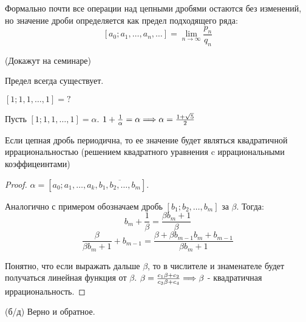 Формально почти все операции над цепными дробями остаются без изменений, но значение дроби определяется как предел подходящего ряда:
$$[a_0;a_1, \dots, a_n,\dots] = \lim_{n \to \infty}\frac{p_n}{q_n}$$
\begin{theorem}{(Докажут на семинаре)}

  Предел всегда существует.
\end{theorem}

\begin{example} $[1; 1, 1, \dots, 1] = ?$

  Пусть $[1; 1, 1, \dots, 1] = \alpha$. $1 + \frac{1}{\alpha} = \alpha \Longrightarrow \alpha = \frac{1 + \sqrt{5}}{2}$
\end{example}

\begin{theorem}
  Если цепная дробь периодична, то ее значение будет являться квадратичной иррациональностью (решением квадратного уравнения c иррациональными коэффицеинтами)
\end{theorem}

\begin{proof}
  $\alpha = [a_0;a_1, \dots, a_k, \overline{b_1, b_2, \dots, b_m}].$


  Аналогично с примером обозначаем дробь $[b_1; b_2, \dots, b_m]$ за $\beta$. Тогда:
  $$b_m + \frac{1}{\beta} = \frac{\beta b_m + 1}{\beta}$$
  $$\frac{\beta}{\beta b_m + 1} + b_{m - 1} = \frac{\beta + \beta b_{m - 1} b_m + b_{m - 1}}{\beta b_m + 1}$$

  Понятно, что если выражать дальше $\beta$, то в числителе и знаменателе будет получаться линейная функция от $\beta$. $\beta = \frac{c_1 \beta + c_2}{c_3 \beta + c_4} \Longrightarrow \beta$ - квадратичная иррациональность.
\end{proof}

\begin{theorem} {(б/д)}
  Верно и обратное.
\end{theorem}